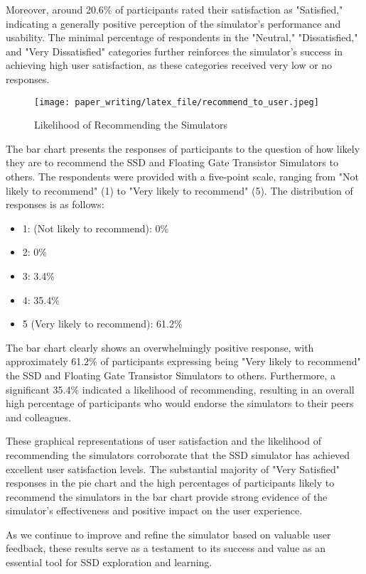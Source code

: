 \documentclass[conference]{/home/habib/Desktop/flash_ssd_simulator_web/paper_writing/latex_file/IEEEtran}
\begin{document}
Moreover, around 20.6\% of participants rated their satisfaction as "Satisfied," indicating a generally positive perception of the simulator's performance and usability. The minimal percentage of respondents in the "Neutral," "Dissatisfied," and "Very Dissatisfied" categories further reinforces the simulator's success in achieving high user satisfaction, as these categories received very low or no responses.
\begin{figure}[h]
    \centering
    \texttt{[image: paper\_writing/latex\_file/recommend\_to\_user.jpeg]}
    \caption{Likelihood of Recommending the Simulators}
    \label{fig:enter-label}
\end{figure}
The bar chart presents the responses of participants to the question of how likely they are to recommend the SSD and Floating Gate Transistor Simulators to others. The respondents were provided with a five-point scale, ranging from "Not likely to recommend" (1) to "Very likely to recommend" (5). The distribution of responses is as follows:
\begin{itemize}
    \item 1: (Not likely to recommend): 0\%
    \item 2: 0\%
    \item 3: 3.4\%
    \item 4: 35.4\%
    \item 5 (Very likely to recommend): 61.2\%
\end{itemize}
The bar chart clearly shows an overwhelmingly positive response, with approximately 61.2\% of participants expressing being "Very likely to recommend" the SSD and Floating Gate Transistor Simulators to others. Furthermore, a significant 35.4\% indicated a likelihood of recommending, resulting in an overall high percentage of participants who would endorse the simulators to their peers and colleagues.

These graphical representations of user satisfaction and the likelihood of recommending the simulators corroborate that the SSD simulator has achieved excellent user satisfaction levels. The substantial majority of "Very Satisfied" responses in the pie chart and the high percentages of participants likely to recommend the simulators in the bar chart provide strong evidence of the simulator's effectiveness and positive impact on the user experience.

As we continue to improve and refine the simulator based on valuable user feedback, these results serve as a testament to its success and value as an essential tool for SSD exploration and learning.
\end{document}
